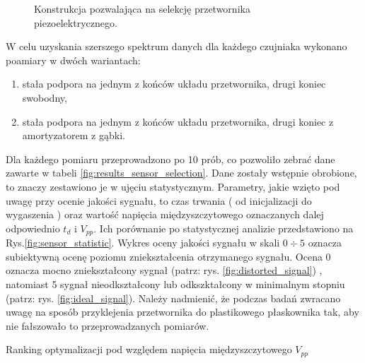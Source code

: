 \begin{figure}[htbp]
\centering
{}%
\caption{Konstrukcja pozwalająca na selekcję przetwornika piezoelektrycznego.}
\label{fig:sensor_sel_geometry}
\end{figure}

W celu uzyskania szerszego spektrum danych dla każdego czujniaka wykonano
poamiary w dwóch wariantach: 
\begin{enumerate}
\item stała podpora na jednym z końców układu przetwornika, drugi koniec swobodny,
\item stała podpora na jednym z końców układu przetwornika, drugi koniec z 
amortyzatorem z gąbki.
\end{enumerate}

Dla każdego pomiaru przeprowadzono po 10 prób, co pozwoliło zebrać dane zawarte w tabeli
\ref{fig:results_sensor_selection}. Dane zostały wstępnie obrobione, to znaczy zestawiono
je w ujęciu statystycznym.
Parametry, jakie wzięto pod uwagę przy ocenie jakości sygnału, to czas trwania 
( od inicjalizacji do wygaszenia ) oraz wartość napięcia międzyszczytowego oznaczanych 
dalej odpowiednio $t_d$ i $V_{pp}$. Ich porównanie po statystycznej analizie 
przedstawiono na Rys.\ref{fig:sensor_statistic}. Wykres oceny jakości sygnału w skali $0\div5$ 
oznacza subiektywną ocenę poziomu zniekształcenia otrzymanego sygnału. Ocena 0 oznacza mocno
zniekształcony sygnał (patrz: rys. \ref{fig:distorted_signal}) , natomiast 5 sygnał nieodkształcony 
lub odkszktałcony w minimalnym stopniu (patrz: rys. \ref{fig:ideal_signal}). 
Należy nadmienić, że podczas badań zwracano uwagę na sposób przyklejenia przetwornika do plastikowego 
płaskownika tak, aby nie fałszowało to przeprowadzanych pomiarów. 


\sensorSelTab

\begin{table}[htbp]
  \caption{Ranking optymalizacji pod względem napięcia międzyszczytowego $V_{pp}$}
  \label{fig:sensor_selection_rank_vpp}

  \centering
\end{table}

